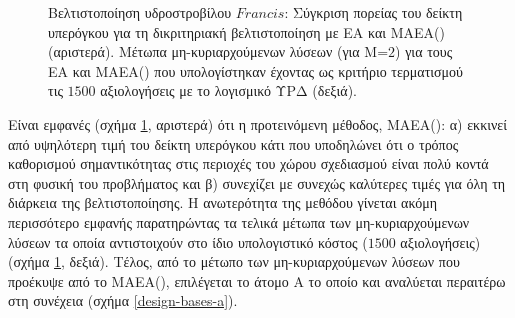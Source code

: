 \begin{figure}[h!]
\begin{minipage}[b]{0.5\linewidth}
 \centering
\end{minipage}
\begin{minipage}[b]{0.5\linewidth}
 \centering
\end{minipage}
\caption{Βελτιστοποίηση υδροστροβίλου $Francis$:  Σύγκριση πορείας του δείκτη υπερόγκου για τη δικριτηριακή βελτιστοποίηση με ΕΑ και ΜΑΕΑ() (αριστερά). Μέτωπα μη-κυριαρχούμενων λύσεων (για Μ=$2$) για τους ΕΑ και ΜΑΕΑ() που υπολογίστηκαν έχοντας ως κριτήριο τερματισμού τις $1500$ αξιολογήσεις με το λογισμικό ΥΡΔ (δεξιά).}
\label{Francis-Res}
\end{figure}

Είναι εμφανές (σχήμα \ref{Francis-Res}, αριστερά) ότι η προτεινόμενη μέθοδος, ΜΑΕΑ(): α) εκκινεί από υψηλότερη τιμή του δείκτη υπερόγκου κάτι που υποδηλώνει ότι ο τρόπος  καθορισμού σημαντικότητας στις περιοχές του χώρου σχεδιασμού είναι πολύ κοντά στη φυσική του προβλήματος και β) συνεχίζει με συνεχώς καλύτερες τιμές για όλη τη διάρκεια της βελτιστοποίησης. Η ανωτερότητα της μεθόδου  γίνεται ακόμη περισσότερο εμφανής παρατηρώντας τα τελικά μέτωπα των μη-κυριαρχούμενων λύσεων τα οποία αντιστοιχούν στο ίδιο υπολογιστικό κόστος ($1500$ αξιολογήσεις) (σχήμα \ref{Francis-Res}, δεξιά). Τέλος, από το μέτωπο των μη-κυριαρχούμενων λύσεων που προέκυψε από το       ΜΑΕΑ(), επιλέγεται το άτομο Α το οποίο και αναλύεται περαιτέρω στη συνέχεια (σχήμα \ref{design-bases-a}).


